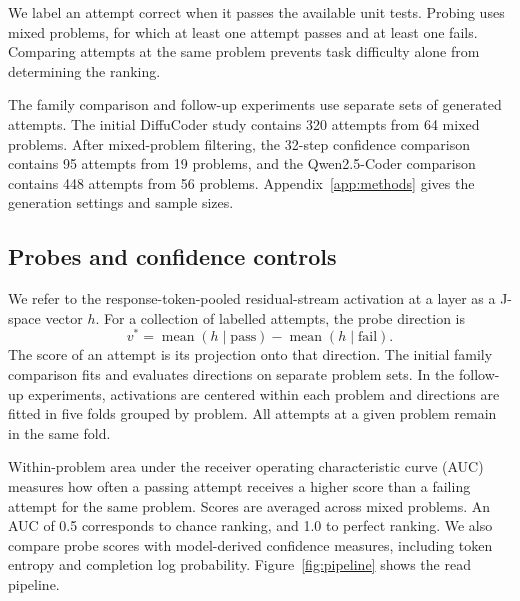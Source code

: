 \documentclass[11pt,letterpaper]{article}
\begin{document}
We label an attempt correct when it passes the available unit tests. Probing uses mixed problems, for which at least one attempt passes and at least one fails. Comparing attempts at the same problem prevents task difficulty alone from determining the ranking.

The family comparison and follow-up experiments use separate sets of generated attempts. The initial DiffuCoder study contains 320 attempts from 64 mixed problems. After mixed-problem filtering, the 32-step confidence comparison contains 95 attempts from 19 problems, and the Qwen2.5-Coder comparison contains 448 attempts from 56 problems. Appendix~\ref{app:methods} gives the generation settings and sample sizes.

\subsection{Probes and confidence controls}

We refer to the response-token-pooled residual-stream activation at a layer as a J-space vector $h$. For a collection of labelled attempts, the probe direction is
\[
v^{*}=\operatorname{mean}(h\mid\mathrm{pass})-\operatorname{mean}(h\mid\mathrm{fail}).
\]
The score of an attempt is its projection onto that direction. The initial family comparison fits and evaluates directions on separate problem sets. In the follow-up experiments, activations are centered within each problem and directions are fitted in five folds grouped by problem. All attempts at a given problem remain in the same fold.

Within-problem area under the receiver operating characteristic curve (AUC) measures how often a passing attempt receives a higher score than a failing attempt for the same problem. Scores are averaged across mixed problems. An AUC of 0.5 corresponds to chance ranking, and 1.0 to perfect ranking. We also compare probe scores with model-derived confidence measures, including token entropy and completion log probability. Figure~\ref{fig:pipeline} shows the read pipeline.
\end{document}
